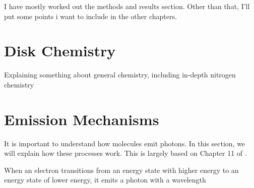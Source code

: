 \documentclass[oneside, single, authoryear, semicolon]{lion-msc}
\newcommand{\4}{$_4$}
\newcommand{\3}{$_3$}
\newcommand{\2}{$_2$}
\begin{document}


I have mostly worked out the methods and results section. Other than that, I'll put some points i want to include in the other chapters.
\section{Disk Chemistry}
Explaining something about general chemistry, including in-depth nitrogen chemistry

\section{Emission Mechanisms}
It is important to understand how molecules emit photons. In this section, we will explain how these processes work. This is largely based on Chapter 11 of \cite{1979rpa..book.....R}. 

When an electron transitions from an energy state with higher energy to an energy state of lower energy, it emits a photon with a wavelength
\end{document}
